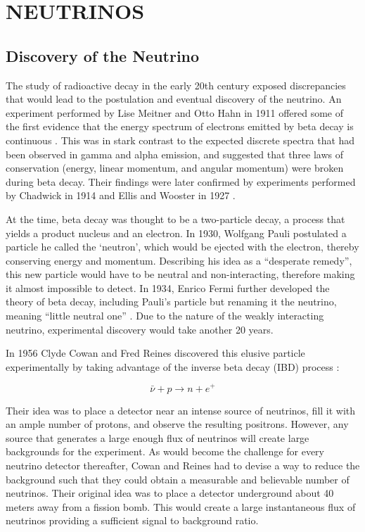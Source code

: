 \chapter{\uppercase{Neutrinos}} \label{ch:Neutrinos}

\section{Discovery of the Neutrino} \label{sec:NeutrinoDiscovery}

The study of radioactive decay in the early 20th century exposed discrepancies that would lead to the postulation and eventual discovery of the neutrino.
An experiment performed by Lise Meitner and Otto Hahn in 1911 offered some of the first evidence that the energy spectrum of electrons emitted by beta decay is continuous \cite{Hahn:1911}. 
This was in stark contrast to the expected discrete spectra that had been observed in gamma and alpha emission, and suggested that three laws of conservation (energy, linear momentum, and angular momentum) were broken during beta decay. 
Their findings were later confirmed by experiments performed by Chadwick in 1914 \cite{Chadwick:1914zz} and Ellis and Wooster in 1927 \cite{Ellis:1927}. 

At the time, beta decay was thought to be a two-particle decay, a process that yields a product nucleus and an electron.
In 1930, Wolfgang Pauli postulated a particle he called the `neutron', which would be ejected with the electron, thereby conserving energy and momentum.
Describing his idea as a ``desperate remedy'', this new particle would have to be neutral and non-interacting, therefore making it almost impossible to detect.
In 1934, Enrico Fermi further developed the theory of beta decay, including Pauli's particle but renaming it the neutrino, meaning ``little neutral one'' \cite{Fermi:1934hr}.
Due to the nature of the weakly interacting neutrino, experimental discovery would take another 20 years.

In 1956 Clyde Cowan and Fred Reines discovered this elusive particle experimentally by taking advantage of the inverse beta decay (IBD) process \cite{Cowan}:

\begin{equation}
	\bar{\nu} + p \rightarrow n + e^{+}
\end{equation}

Their idea was to place a detector near an intense source of neutrinos, fill it with an ample number of protons, and observe the resulting positrons. 
However, any source that generates a large enough flux of neutrinos will create large backgrounds for the experiment. 
As would become the challenge for every neutrino detector thereafter, Cowan and Reines had to devise a way to reduce the background such that they could obtain a measurable and believable number of neutrinos.
Their original idea was to place a detector underground about 40 meters away from a fission bomb. 
This would create a large instantaneous flux of neutrinos providing a sufficient signal to background ratio. 

